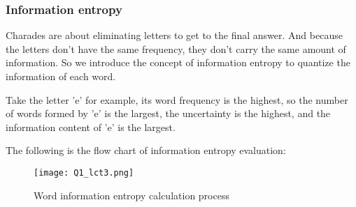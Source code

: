 \documentclass{mcmthesis}
\begin{document}
%
%
%
%
%
%
%
\subsubsection{Information entropy}
Charades are about eliminating letters to get to the final answer. And because the letters don't have the same frequency, they don't carry the same amount of information. So we introduce the concept of information entropy to quantize the information of each word.

Take the letter 'e' for example, its word frequency is the highest, so the number of words formed by 'e' is the largest, the uncertainty is the highest, and the information content of 'e' is the largest.

The following is the flow chart of information entropy evaluation:
\begin{figure}[H]
	\centering
	\texttt{[image: Q1\_lct3.png]}
	\caption{\small Word information entropy calculation process}
\end{figure}
\end{document}
